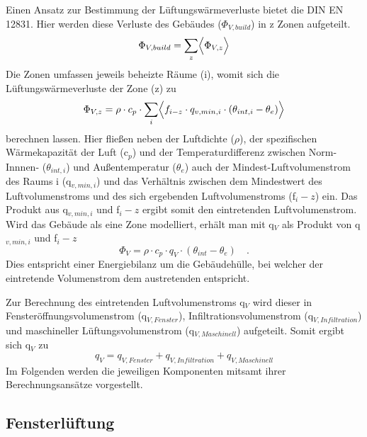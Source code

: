 Einen Ansatz zur Bestimmung der Lüftungswärmeverluste bietet die DIN EN 12831.
Hier werden diese Verluste des Gebäudes (\(\Phi_{V,build}\)) in z Zonen aufgeteilt.
\begin{equation}
\label{eq:Gleichung311}
\Phi_{V,build} = \sum_{z} \Bigl\langle \Phi_{V,z} \Bigr\rangle
\end{equation}
Die Zonen umfassen jeweils beheizte Räume (i), womit sich die Lüftungswärmeverluste der Zone (z) zu
\begin{equation}
\label{eq:Gleichung312}
\Phi_{V,z} = \rho \cdot c_p \cdot \sum_{i} \Bigl\langle f_{i-z} \cdot q_{v,min,i} \cdot (\theta_{int,i} - \theta_e) \Bigr\rangle
\end{equation}
berechnen lassen.
Hier fließen neben der Luftdichte (\(\rho\)), der spezifischen Wärmekapazität der Luft (c\(_p\)) und der Temperaturdifferenz zwischen Norm-Innnen- (\(\theta_{int,i}\)) und Außentemperatur (\(\theta_{e}\)) auch der Mindest-Luftvolumenstrom des Raums i (q\(_{v,min,i}\)) und das Verhältnis zwischen dem Mindestwert des Luftvolumenstroms und des sich ergebenden Luftvolumenstroms (f\(_i-z\)) ein.
Das Produkt aus q\(_{v,min,i}\) und f\(_i-z\) ergibt somit den eintretenden Luftvolumenstrom.
Wird das Gebäude als eine Zone modelliert, erhält man mit q\(_V\) als Produkt von q\(_{v,min,i}\) und f\(_i-z\) 
\begin{equation}
\label{eq:Gleichung313}
\Phi_{V} = \rho \cdot c_p \cdot q_V \cdot (\theta_{int} - \theta_e) \quad \text{.}
\end{equation}
Dies entspricht einer Energiebilanz um die Gebäudehülle, bei welcher der eintretende Volumenstrom dem austretenden entspricht.

Zur Berechnung des eintretenden Luftvolumenstroms q\(_V\) wird dieser in Fensteröffnungsvolumenstrom (q\(_{V, Fenster}\)), Infiltrationsvolumenstrom (q\(_{V, Infiltration}\)) und maschineller Lüftungsvolumenstrom (q\(_{V, Maschinell}\)) aufgeteilt.
Somit ergibt sich q\(_V\) zu
\begin{equation}
\label{eq:Gleichung314}
q_V = q_{V, Fenster} + q_{V, Infiltration} + q_{V, Maschinell}
\end{equation}
Im Folgenden werden die jeweiligen Komponenten mitsamt ihrer Berechnungsansätze vorgestellt.

\subsection{Fensterlüftung}
\label{subsec:Sektion 311}

